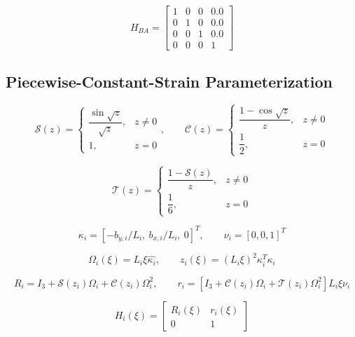 \documentclass[11pt]{article}
\newcommand{\Sfun}{\mathcal{S}}
\newcommand{\Cfun}{\mathcal{C}}
\newcommand{\Tfun}{\mathcal{T}}
\begin{document}
\begin{equation}
H_{BA}=\begin{bmatrix}1 & 0 & 0 & 0.0\\0 & 1 & 0 & 0.0\\0 & 0 & 1 & 0.0\\0 & 0 & 0 & 1\end{bmatrix}\label{eq:mount-transform}
\end{equation}

\subsection{Piecewise-Constant-Strain Parameterization}
\begin{equation}
\Sfun(z)=\begin{cases}\dfrac{\sin\sqrt z}{\sqrt z},&z\ne0\\1,&z=0\end{cases},\qquad \Cfun(z)=\begin{cases}\dfrac{1-\cos\sqrt z}{z},&z\ne0\\\dfrac12,&z=0\end{cases}
\end{equation}

\begin{equation}
\Tfun(z)=\begin{cases}\dfrac{1-\Sfun(z)}{z},&z\ne0\\\dfrac16,&z=0\end{cases}
\end{equation}

\begin{equation}
\kappa_i=[-b_{y,i}/L_i,\ b_{x,i}/L_i,\ 0]^T,\qquad\nu_i=[0,0,1]^T
\end{equation}

\begin{equation}
\Omega_i(\xi)=L_i\xi\widehat{\kappa_i},\qquad z_i(\xi)=(L_i\xi)^2\kappa_i^T\kappa_i
\end{equation}

\begin{equation}
R_i=I_3+\Sfun(z_i)\Omega_i+\Cfun(z_i)\Omega_i^2,\qquad r_i=\left[I_3+\Cfun(z_i)\Omega_i+\Tfun(z_i)\Omega_i^2\right]L_i\xi\nu_i
\end{equation}

\begin{equation}
H_i(\xi)=\begin{bmatrix}R_i(\xi)&r_i(\xi)\\0&1\end{bmatrix}\label{eq:local-transform}
\end{equation}
\end{document}
